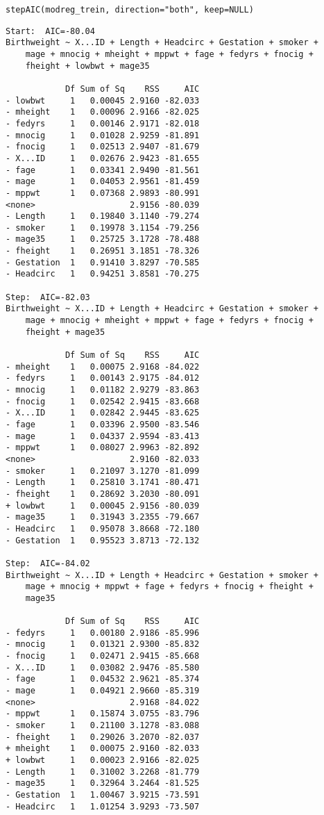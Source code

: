 \documentclass[11pt]{article}
\begin{document}
\begin{enumerate}
\begin{verbatim}
stepAIC(modreg_trein, direction="both", keep=NULL)
\end{verbatim}

\begin{verbatim}
Start:  AIC=-80.04
Birthweight ~ X...ID + Length + Headcirc + Gestation + smoker + 
    mage + mnocig + mheight + mppwt + fage + fedyrs + fnocig + 
    fheight + lowbwt + mage35

            Df Sum of Sq    RSS     AIC
- lowbwt     1   0.00045 2.9160 -82.033
- mheight    1   0.00096 2.9166 -82.025
- fedyrs     1   0.00146 2.9171 -82.018
- mnocig     1   0.01028 2.9259 -81.891
- fnocig     1   0.02513 2.9407 -81.679
- X...ID     1   0.02676 2.9423 -81.655
- fage       1   0.03341 2.9490 -81.561
- mage       1   0.04053 2.9561 -81.459
- mppwt      1   0.07368 2.9893 -80.991
<none>                   2.9156 -80.039
- Length     1   0.19840 3.1140 -79.274
- smoker     1   0.19978 3.1154 -79.256
- mage35     1   0.25725 3.1728 -78.488
- fheight    1   0.26951 3.1851 -78.326
- Gestation  1   0.91410 3.8297 -70.585
- Headcirc   1   0.94251 3.8581 -70.275

Step:  AIC=-82.03
Birthweight ~ X...ID + Length + Headcirc + Gestation + smoker + 
    mage + mnocig + mheight + mppwt + fage + fedyrs + fnocig + 
    fheight + mage35

            Df Sum of Sq    RSS     AIC
- mheight    1   0.00075 2.9168 -84.022
- fedyrs     1   0.00143 2.9175 -84.012
- mnocig     1   0.01182 2.9279 -83.863
- fnocig     1   0.02542 2.9415 -83.668
- X...ID     1   0.02842 2.9445 -83.625
- fage       1   0.03396 2.9500 -83.546
- mage       1   0.04337 2.9594 -83.413
- mppwt      1   0.08027 2.9963 -82.892
<none>                   2.9160 -82.033
- smoker     1   0.21097 3.1270 -81.099
- Length     1   0.25810 3.1741 -80.471
- fheight    1   0.28692 3.2030 -80.091
+ lowbwt     1   0.00045 2.9156 -80.039
- mage35     1   0.31943 3.2355 -79.667
- Headcirc   1   0.95078 3.8668 -72.180
- Gestation  1   0.95523 3.8713 -72.132

Step:  AIC=-84.02
Birthweight ~ X...ID + Length + Headcirc + Gestation + smoker + 
    mage + mnocig + mppwt + fage + fedyrs + fnocig + fheight + 
    mage35

            Df Sum of Sq    RSS     AIC
- fedyrs     1   0.00180 2.9186 -85.996
- mnocig     1   0.01321 2.9300 -85.832
- fnocig     1   0.02471 2.9415 -85.668
- X...ID     1   0.03082 2.9476 -85.580
- fage       1   0.04532 2.9621 -85.374
- mage       1   0.04921 2.9660 -85.319
<none>                   2.9168 -84.022
- mppwt      1   0.15874 3.0755 -83.796
- smoker     1   0.21100 3.1278 -83.088
- fheight    1   0.29026 3.2070 -82.037
+ mheight    1   0.00075 2.9160 -82.033
+ lowbwt     1   0.00023 2.9166 -82.025
- Length     1   0.31002 3.2268 -81.779
- mage35     1   0.32964 3.2464 -81.525
- Gestation  1   1.00467 3.9215 -73.591
- Headcirc   1   1.01254 3.9293 -73.507


\end{verbatim}
\end{enumerate}
\end{document}
